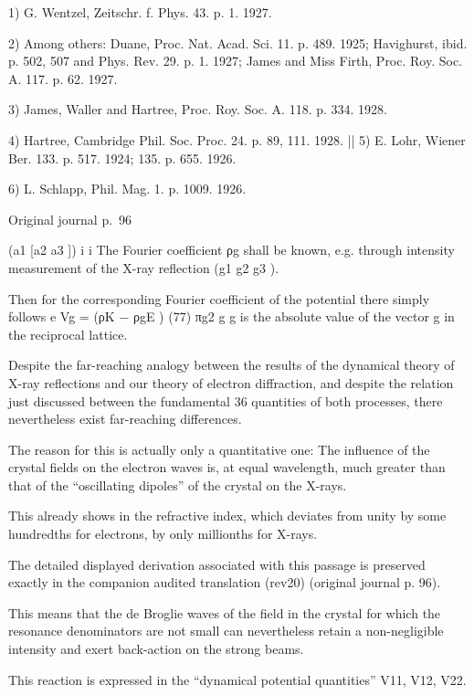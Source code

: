 \documentclass[10pt]{article}
\newcommand{\origpage}[1]{\par\medskip\noindent\hfill{\small\color{notegray}Original journal p.~#1}\hfill\mbox{}\par\smallskip}
\begin{document}
\noindent\footnotesize 1) G. Wentzel, Zeitschr. f. Phys. 43. p. 1. 1927.\par\normalsize
\noindent\footnotesize 2) Among others: Duane, Proc. Nat. Acad. Sci. 11. p. 489. 1925; Havighurst, ibid. p. 502, 507 and Phys. Rev. 29. p. 1. 1927; James and Miss Firth, Proc. Roy. Soc. A. 117. p. 62. 1927.\par\normalsize
\noindent\footnotesize 3) James, Waller and Hartree, Proc. Roy. Soc. A. 118. p. 334. 1928.\par\normalsize
\noindent\footnotesize 4) Hartree, Cambridge Phil. Soc. Proc. 24. p. 89, 111. 1928. || 5) E. Lohr, Wiener Ber. 133. p. 517. 1924; 135. p. 655. 1926.\par\normalsize
\noindent\footnotesize 6) L. Schlapp, Phil. Mag. 1. p. 1009. 1926.\par\normalsize
\origpage{96}
(a1 [a2 a3 ]) i i The Fourier coefficient ρg shall be known, e.g. through intensity measurement of the X-ray reflection (g1 g2 g3 ).\par
Then for the corresponding Fourier coefficient of the potential there simply follows e Vg = (ρK − ρgE ) (77) πg2 g g is the absolute value of the vector g in the reciprocal lattice.\par
Despite the far-reaching analogy between the results of the dynamical theory of X-ray reflections and our theory of electron diffraction, and despite the relation just discussed between the fundamental 36 quantities of both processes, there nevertheless exist far-reaching differences.\par
The reason for this is actually only a quantitative one: The influence of the crystal fields on the electron waves is, at equal wavelength, much greater than that of the “oscillating dipoles” of the crystal on the X-rays.\par
This already shows in the refractive index, which deviates from unity by some hundredths for electrons, by only millionths for X-rays.\par
The detailed displayed derivation associated with this passage is preserved exactly in the companion audited translation (rev20) (original journal p. 96).\par
This means that the de Broglie waves of the field in the crystal for which the resonance denominators are not small can nevertheless retain a non-negligible intensity and exert back-action on the strong beams.\par
This reaction is expressed in the “dynamical potential quantities” V11, V12, V22.\par
\end{document}
